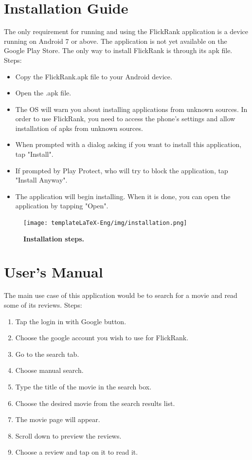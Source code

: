 \documentclass[12pt,a4paper,twoside]{report}
\begin{document}
\section{Installation Guide}
The only requirement for running and using the FlickRank application is a device running on Android 7 or above. The application is not yet available on the Google Play Store. The only way to install FlickRank is through its apk file. Steps:
\begin{itemize}
    \item Copy the FlickRank.apk file to your Android device.
    \item Open the .apk file.
    \item The OS will warn you about installing applications from unknown sources. In order to use FlickRank, you need to access the phone's settings and allow installation of apks from unknown sources.
    \item When prompted with a dialog asking if you want to install this application, tap "Install".
    \item If prompted by Play Protect, who will try to block the application, tap "Install Anyway".
    \item The application will begin installing. When it is done, you can open the application by tapping "Open".
\end{itemize}
\newpage
 \begin{figure}[H]
    \begin{center}
        \texttt{[image: templateLaTeX-Eng/img/installation.png]}
        \caption{\bf Installation steps.}
    \end{center}
\end{figure}

\section{User's Manual}
The main use case of this application would be to search for a movie and read some of its reviews. Steps: 
\begin{enumerate}
    \item Tap the login in with Google button.
    \item Choose the google account you wish to use for FlickRank.
    \item Go to the search tab.
    \item Choose manual search.
    \item Type the title of the movie in the search box.
    \item Choose the desired movie from the search results list.
    \item The movie page will appear.
    \item Scroll down to preview the reviews.
    \item Choose a review and tap on it to read it.
\end{enumerate}
\end{document}
